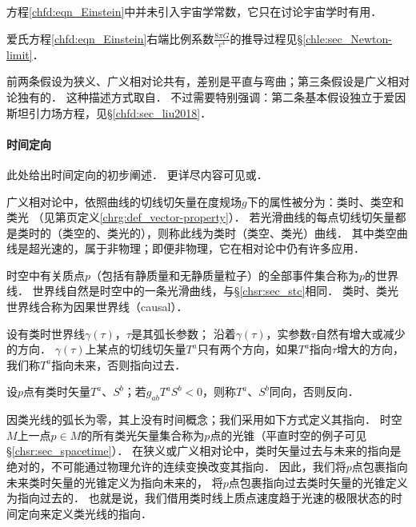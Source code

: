 方程\eqref{chfd:eqn_Einstein}中并未引入宇宙学常数，它只在讨论宇宙学时有用．

爱氏方程\eqref{chfd:eqn_Einstein}右端比例系数$\frac{8\pi G}{c^4}$的推导过程见\S\ref{chle:sec_Newton-limit}．

\begin{remark}
    前两条假设为狭义、广义相对论共有，差别是平直与弯曲；第三条假设是广义相对论独有的．    
    这种描述方式取自\textcite[Ch.3]{hawking-ellis1973}．
    不过需要特别强调：第二条基本假设独立于爱因斯坦引力场方程，见\S\ref{chfd:sec_liu2018}．
\end{remark}


%


\paragraph{时间定向}
此处给出时间定向的初步阐述．
更详尽内容可见\parencite[\S 6.1]{hawking-ellis1973}或\parencite[p.143]{oneill1983}．

广义相对论中，依照曲线的切线切矢量在度规场$g$下的属性被分为：类时、类空和类光
（见第\pageref{chrg:def_vector-property}页定义\ref{chrg:def_vector-property}）．
若光滑曲线的每点切线切矢量都是类时的（类空的、类光的），则称此线为类时（类空、类光）曲线．
其中类空曲线是超光速的，属于非物理；即便非物理，它在相对论中仍有许多应用．

时空中有关质点$p$（包括有静质量和无静质量粒子）的全部事件集合称为$p$的{\heiti 世界线}．
世界线自然是时空中的一条光滑曲线，与\S\ref{chsr:sec_stc}相同．
类时、类光世界线合称为{\heiti 因果世界线}（causal）．

设有类时世界线$\gamma(\tau)$，$\tau$是其弧长参数；
沿着$\gamma(\tau)$，实参数$\tau$自然有增大或减少的方向．
$\gamma(\tau)$上某点的切线切矢量$T^a$只有两个方向，如果$T^a$指向$\tau$增大的方向，
我们称$T^a${\heiti 指向未来}，否则{\heiti 指向过去}．

设$p$点有类时矢量$T^a$、$S^b$；若$g_{ab}T^a S^b <0$，则称$T^a$、$S^b${\heiti 同向}，否则{\heiti 反向}．


因类光线的弧长为零，其上没有时间概念；我们采用如下方式定义其指向．
时空$M$上一点$p\in M$的所有类光矢量集合称为$p$点的{\heiti 光锥}（平直时空的例子可见\S\ref{chsr:sec_spacetime}）．
在狭义或广义相对论中，类时矢量过去与未来的指向是绝对的，不可能通过物理允许的连续变换改变其指向．
因此，我们将$p$点包裹指向未来类时矢量的光锥定义为{\heiti 指向未来}的，
将$p$点包裹指向过去类时矢量的光锥定义为{\heiti 指向过去}的．
也就是说，我们借用类时线上质点速度趋于光速的极限状态的时间定向来定义类光线的指向．




